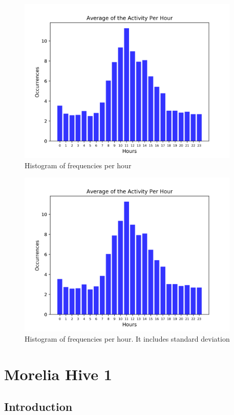 \documentclass[11pt,fleqn]{book} %
\begin{document}
\begin{figure}[h!]%
\centering%
\includegraphics[width=400px]{Pictures/plots/good/Morelia Hive 2histogramClean.png}%
\caption{Histogram of frequencies per hour}%
\end{figure}

%


\begin{figure}[h!]%
\centering%
\includegraphics[width=400px]{Pictures/plots/good/Morelia Hive 2histogramClean.png}%
\caption{Histogram of frequencies per hour. It includes standard deviation}%
\end{figure}

\part{Morelia Hive 1}
\chapter{Introduction} 
\normalsize%
\end{document}
